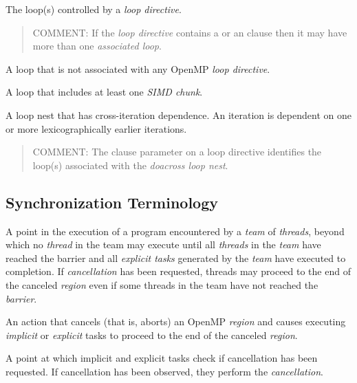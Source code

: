 \glossarydefstart
The loop(s) controlled by a \emph{loop directive}.
\begin{quote}
COMMENT: If the \emph{loop directive} contains a  or an \code{)} clause then it may have more than one \emph{associated loop}.
\end{quote}
\glossarydefend

\glossarydefstart
A loop that is not associated with any OpenMP \emph{loop directive}.
\glossarydefend

\glossarydefstart
A loop that includes at least one \emph{SIMD chunk}.
\glossarydefend

\glossarydefstart
A loop nest that has cross-iteration dependence. An iteration is dependent on one or more lexicographically earlier iterations.
\begin{quote}
COMMENT: The  clause parameter on a loop directive identifies the loop(s) associated with the \emph{doacross loop nest}.
\end{quote}
\glossarydefend

%
%
\subsection{Synchronization Terminology}
\label{subsec:Synchronization Terminology}
\glossarydefstart
A point in the execution of a program encountered by a \emph{team} of \emph{threads}, beyond 
which no \emph{thread} in the team may execute until all \emph{threads} in the \emph{team} have 
reached the barrier and all \emph{explicit tasks} generated by the \emph{team} have executed to 
completion. If \emph{cancellation} has been requested, threads may proceed to the end of 
the canceled \emph{region} even if some threads in the team have not reached the \emph{barrier}.
\glossarydefend

\glossarydefstart
An action that cancels (that is, aborts) an OpenMP \emph{region} and causes executing 
\emph{implicit} or \emph{explicit} tasks to proceed to the end of the canceled \emph{region}. 
\glossarydefend

\glossarydefstart
A point at which implicit and explicit tasks check if cancellation has been 
requested. If cancellation has been observed, they perform the \emph{cancellation}. 


